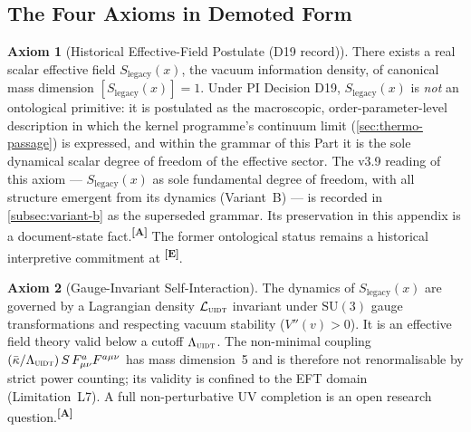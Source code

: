 \documentclass[12pt,a4paper,twoside]{article}
\theoremstyle{plain}
\theoremstyle{definition}
\newtheorem{axiom}{Axiom}
\theoremstyle{remark}
\newcommand{\UIDT}{\textsc{uidt}} %
\newcommand{\catmark}[1]{\textsuperscript{\textsf{\textbf{[#1]}}}}
\newcommand{\LegacySx}{S_{\mathrm{legacy}}(x)} %
\begin{document}
\subsection{The Four Axioms in Demoted Form}
\label{subsec:four-axioms}

\begin{axiom}[Historical Effective-Field Postulate (D19 record)]
\label{ax:primacy}
There exists a real scalar effective field $\LegacySx$, the vacuum information
density, of canonical mass dimension $[\LegacySx]=1$. Under PI Decision D19, $\LegacySx$ is \emph{not} an ontological primitive: it is postulated
as the macroscopic, order-parameter-level description in which the
kernel programme's continuum limit (\cref{sec:thermo-passage}) is
expressed, and within the grammar of this Part it is the sole dynamical
scalar degree of freedom of the effective sector. The v3.9 reading of
this axiom --- $\LegacySx$ as sole fundamental degree of freedom, with all
structure emergent from its dynamics (Variant~B) --- is recorded in
\cref{subsec:variant-b} as the superseded grammar. Its preservation in this
appendix is a document-state fact.\catmark{A} The former ontological status
remains a historical interpretive commitment at \catmark{E}.
\end{axiom}

\begin{axiom}[Gauge-Invariant Self-Interaction]
\label{ax:gauge}
The dynamics of $\LegacySx$ are governed by a Lagrangian density
$\mathcal{L}_{\UIDT}$ invariant under $\mathrm{SU}(3)$ gauge
transformations and respecting vacuum stability ($V''(v)>0$). It is an
effective field theory valid below a cutoff $\Lambda_{\UIDT}$. The
non-minimal coupling
$(\bar\kappa/\Lambda_{\UIDT})\,S\,F_{\mu\nu}^a F^{a\mu\nu}$ has mass
dimension~5 and is therefore not renormalisable by strict power
counting; its validity is confined to the EFT domain (Limitation~L7). A
full non-perturbative UV completion is an open research
question.\catmark{A}
\end{axiom}
\end{document}
